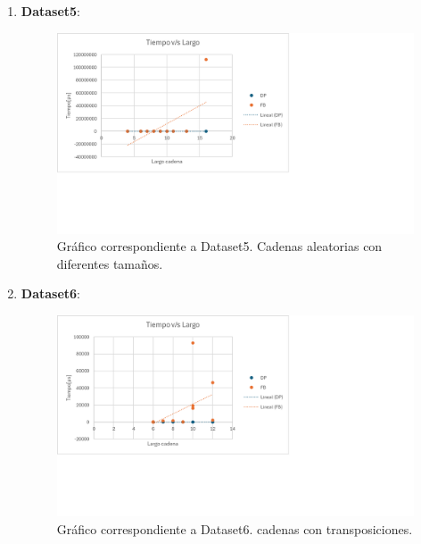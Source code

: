 \begin{enumerate}
    \item \textbf{Dataset5}: 
    \begin{figure}[H]
        \centering
        \includegraphics[width=\textwidth]{tikz/Grafico5.png}
        \caption{Gráfico correspondiente a Dataset5. Cadenas aleatorias con diferentes tamaños.}
        \label{fig:dataset5}
    \end{figure}

    \item \textbf{Dataset6}: 
    \begin{figure}[H]
        \centering
        \includegraphics[width=\textwidth]{tikz/Grafico6.png}
        \caption{Gráfico correspondiente a Dataset6. cadenas con transposiciones.}
        \label{fig:dataset6}
    \end{figure}
\end{enumerate}
